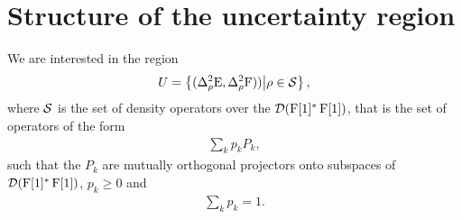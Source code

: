 


\section{Structure of the uncertainty region}\label{sec:box-ur-structure}

We are interested in the region
\begin{align}
  U = \left\{(\varr{\ope}, \varr{\opf}))\middle|\rho\in \dops\right\},
\end{align}
where $\dops$ is the set of density operators over the $\mathcal{D}(\operatorname{F}[1]^*\operatorname{F}[1])$, that is the set of operators of the form
\begin{align}
  \sum_k p_k P_k,
\end{align}
such that the $P_k$ are mutually orthogonal projectors onto subspaces of $\mathcal{D}(\operatorname{F}[1]^*\operatorname{F}[1])$, $p_k\geq 0$ and
\begin{align}
  \sum_k p_k = 1.
\end{align}

